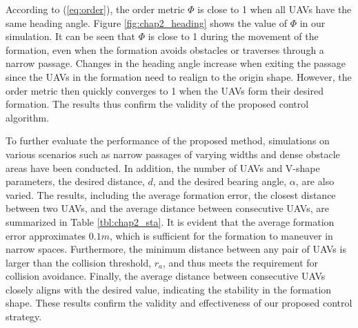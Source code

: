 According to (\ref{eq:order}), the order metric $\Phi$ is close to 1 when all UAVs have the same heading angle. Figure \ref{fig:chap2_heading} shows the value of $\Phi$ in our simulation. It can be seen that $\Phi$ is close to 1 during the movement of the formation, even when the formation avoids obstacles or traverses through a narrow passage. Changes in the heading angle increase when exiting the passage since the UAVs in the formation need to realign to the origin shape. However, the order metric then quickly converges to 1 when the UAVs form their desired formation. The results thus confirm the validity of the proposed control algorithm.

To further evaluate the performance of the proposed method, simulations on various scenarios such as narrow passages of varying widths and dense obstacle areas have been conducted. In addition, the number of UAVs and V-shape parameters, the desired distance, $d$, and the desired bearing angle, $\alpha$, are also varied. The results, including the average formation error, the closest distance between two UAVs, and the average distance between consecutive UAVs, are summarized in Table {\ref{tbl:chap2_sta}}. It is evident that the average formation error approximates $0.1m$, which is sufficient for the formation to maneuver in narrow spaces. Furthermore, the minimum distance between any pair of UAVs is larger than the collision threshold, $r_a$, and thus meets the requirement for collision avoidance. Finally, the average distance between consecutive UAVs closely aligns with the desired value, indicating the stability in the formation shape. These results confirm the validity and effectiveness of our proposed control strategy.